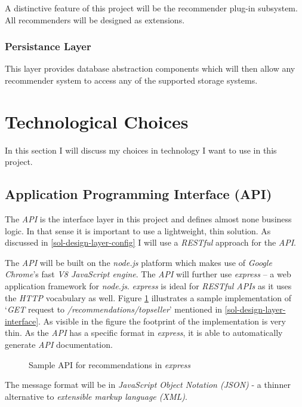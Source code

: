 A distinctive feature of this project will be the recommender plug-in subsystem. All recommenders will be designed as extensions.

\subsubsection{Persistance Layer}

This layer provides database abstraction components which will then allow any recommender system to access any of the supported storage systems.



\section{Technological Choices}

In this section I will discuss my choices in technology I want to use in this project.

\subsection{Application Programming Interface (API)}

The \emph{API} is the interface layer in this project and defines almost none business logic. In that sense it is important to use a lightweight, thin solution. As discussed in \ref{sol-design-layer-config} I will use a \emph{RESTful} approach for the \emph{API}.

The \emph{API} will be built on the \emph{node.js} platform which makes use of \emph{Google Chrome}'s fast \emph{V8 JavaScript engine}. The \emph{API} will further use \emph{express} -- a web application framework for \emph{node.js}. \emph{express} is ideal for \emph{RESTful APIs} as it uses the \emph{HTTP} vocabulary as well. Figure \ref{lst:expressjs} illustrates a sample implementation of `\emph{GET} request to \emph{/recommendations/topseller}' mentioned in \ref{sol-design-layer-interface}. As visible in the figure the footprint of the implementation is very thin. As the \emph{API} has a specific format in \emph{express}, it is able to automatically generate \emph{API} documentation.

\begin{figure}[ht]
    \caption{Sample API for recommendations in \emph{express}}
    \label{lst:expressjs}
\end{figure}

The message format will be in \emph{JavaScript Object Notation (JSON)} - a thinner alternative to \emph{extensible markup language (XML)}.




